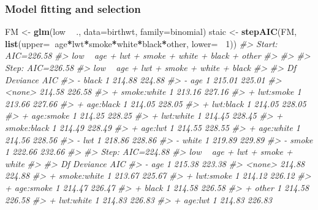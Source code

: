 \documentclass[]{article}
\newenvironment{Shaded}{\begin{snugshade}}{\end{snugshade}}
\newcommand{\CommentTok}[1]{\textcolor[rgb]{0.56,0.35,0.01}{\textit{#1}}}
\newcommand{\DataTypeTok}[1]{\textcolor[rgb]{0.13,0.29,0.53}{#1}}
\newcommand{\DecValTok}[1]{\textcolor[rgb]{0.00,0.00,0.81}{#1}}
\newcommand{\KeywordTok}[1]{\textcolor[rgb]{0.13,0.29,0.53}{\textbf{#1}}}
\newcommand{\NormalTok}[1]{#1}
\newcommand{\OperatorTok}[1]{\textcolor[rgb]{0.81,0.36,0.00}{\textbf{#1}}}
\newcommand{\StringTok}[1]{\textcolor[rgb]{0.31,0.60,0.02}{#1}}
\begin{document}
\hypertarget{model-fitting-and-selection}{%
\subsubsection{Model fitting and
selection}\label{model-fitting-and-selection}}

\begin{Shaded}
\begin{Highlighting}[]
\NormalTok{FM <-}\StringTok{ }\KeywordTok{glm}\NormalTok{(low }\OperatorTok{~}\StringTok{ }\NormalTok{., }\DataTypeTok{data=}\NormalTok{birthwt, }\DataTypeTok{family=}\NormalTok{binomial)}
\NormalTok{staic <-}\StringTok{ }\KeywordTok{stepAIC}\NormalTok{(FM, }\KeywordTok{list}\NormalTok{(}\DataTypeTok{upper=}\OperatorTok{~}\NormalTok{age}\OperatorTok{*}\NormalTok{lwt}\OperatorTok{*}\NormalTok{smoke}\OperatorTok{*}\NormalTok{white}\OperatorTok{*}\NormalTok{black}\OperatorTok{*}\NormalTok{other, }\DataTypeTok{lower=} \OperatorTok{~}\DecValTok{1}\NormalTok{))}
\CommentTok{#> Start:  AIC=226.58}
\CommentTok{#> low ~ age + lwt + smoke + white + black + other}
\CommentTok{#> }
\CommentTok{#> }
\CommentTok{#> Step:  AIC=226.58}
\CommentTok{#> low ~ age + lwt + smoke + white + black}
\CommentTok{#> }
\CommentTok{#>               Df Deviance    AIC}
\CommentTok{#> - black        1   214.88 224.88}
\CommentTok{#> - age          1   215.01 225.01}
\CommentTok{#> <none>             214.58 226.58}
\CommentTok{#> + smoke:white  1   213.16 227.16}
\CommentTok{#> + lwt:smoke    1   213.66 227.66}
\CommentTok{#> + age:black    1   214.05 228.05}
\CommentTok{#> + lwt:black    1   214.05 228.05}
\CommentTok{#> + age:smoke    1   214.25 228.25}
\CommentTok{#> + lwt:white    1   214.45 228.45}
\CommentTok{#> + smoke:black  1   214.49 228.49}
\CommentTok{#> + age:lwt      1   214.55 228.55}
\CommentTok{#> + age:white    1   214.56 228.56}
\CommentTok{#> - lwt          1   218.86 228.86}
\CommentTok{#> - white        1   219.89 229.89}
\CommentTok{#> - smoke        1   222.66 232.66}
\CommentTok{#> }
\CommentTok{#> Step:  AIC=224.88}
\CommentTok{#> low ~ age + lwt + smoke + white}
\CommentTok{#> }
\CommentTok{#>               Df Deviance    AIC}
\CommentTok{#> - age          1   215.38 223.38}
\CommentTok{#> <none>             214.88 224.88}
\CommentTok{#> + smoke:white  1   213.67 225.67}
\CommentTok{#> + lwt:smoke    1   214.12 226.12}
\CommentTok{#> + age:smoke    1   214.47 226.47}
\CommentTok{#> + black        1   214.58 226.58}
\CommentTok{#> + other        1   214.58 226.58}
\CommentTok{#> + lwt:white    1   214.83 226.83}
\CommentTok{#> + age:lwt      1   214.83 226.83}

\end{Highlighting}
\end{Shaded}
\end{document}
